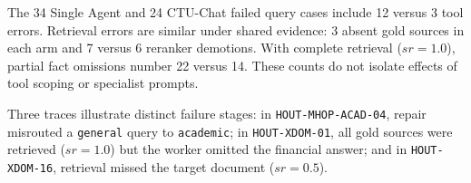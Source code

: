 The 34 Single Agent and 24 CTU-Chat failed query cases include 12 versus 3 tool errors. Retrieval errors are similar under shared evidence: 3 absent gold sources in each arm and 7 versus 6 reranker demotions. With complete retrieval ($sr=1.0$), partial fact omissions number 22 versus 14. These counts do not isolate effects of tool scoping or specialist prompts.

Three traces illustrate distinct failure stages: in \texttt{HOUT-MHOP-}\allowbreak\texttt{ACAD-04}, repair misrouted a \texttt{general} query to \texttt{academic}; in \texttt{HOUT-XDOM-}\allowbreak\texttt{01}, all gold sources were retrieved ($sr{=}1.0$) but the worker omitted the financial answer; and in \texttt{HOUT-XDOM-}\allowbreak\texttt{16}, retrieval missed the target document ($sr{=}0.5$).

